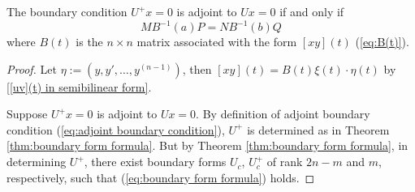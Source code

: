 \documentclass[11pt, oneside, a4paper]{article}
\begin{document}
\begin{thm}\cite[p.289]{CoddingtonLevinson}\label{thm:condition iff adjoint}
    The boundary condition $U^+x=0$ is adjoint to $Ux=0$ if and only if
    \begin{equation}\label{eq:condition iff adjoint}
        MB^{-1}(a)P = NB^{-1}(b)Q
    \end{equation}
    where $B(t)$ is the $n\times n$ matrix associated with the form $[xy](t)$ (\ref{eq:B(t)}).
\end{thm}
\begin{proof}
    Let $\eta := (y, y', \ldots, y^{(n-1)})$,
    then $[xy](t)=B(t)\xi(t)\cdot \eta(t)$ by \eqref{[uv](t) in semibilinear form}.

    Suppose $U^+x=0$ is adjoint to $Ux=0$. By definition of adjoint boundary condition (\ref{eq:adjoint boundary condition}), $U^+$ is determined as in Theorem \ref{thm:boundary form formula}. But by Theorem \ref{thm:boundary form formula}, in determining $U^+$, there exist boundary forms $U_c$, $U_c^+$ of rank $2n-m$ and $m$, respectively, such that (\ref{eq:boundary form formula}) holds. 


\end{proof}
\end{document}
